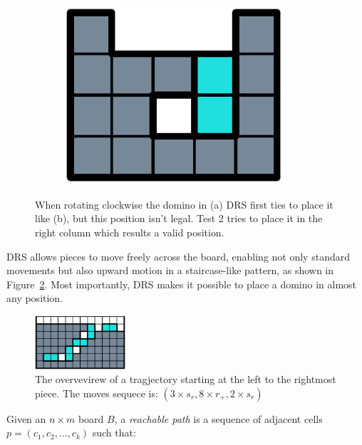 \begin{figure}[ht]
\begin{subfigure}[b]{0.15\textwidth}
    \includegraphics[width=0.9\textwidth]{pictures/dominoes/drs-3.pdf}
    \caption{}
  \end{subfigure}
  \caption{When rotating clockwise the domino in (a) DRS first ties to place it like (b), but this position isn't legal. Test 2 tries to place it in the right column which results a valid position.}
  \label{dom:drs}
\end{figure}

DRS allows pieces to move freely across the board, enabling not only standard movements but also upward motion in a staircase-like pattern, as shown in Figure~\ref{dom:staircase}. Most importantly, DRS makes it possible to place a domino in almost any position.

\begin{figure}
  \centering
  \includegraphics[width=0.3\textwidth]{pictures/dominoes/staricase.pdf}
  \caption{The overvevirew of a tragjectory starting at the left to the rightmost piece. The moves sequece is: $(3 \times s_r, 8 \times r_+, 2 \times s_r)$}
  \label{dom:staircase}
\end{figure}

\begin{definition}
  Given an $n \times m$ board $B$, a \emph{reachable path} is a sequence of adjacent cells \( p = (c_1, c_2, \dots, c_k) \) such that:
\end{definition}

